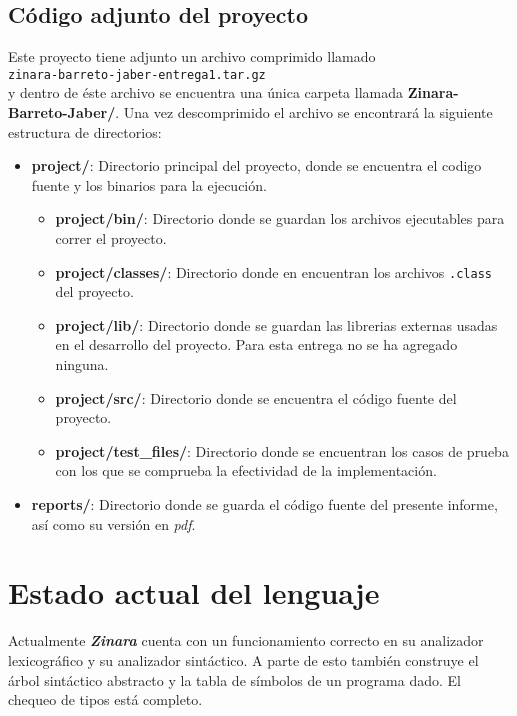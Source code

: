 \documentclass[12pt, spanish]{report}
\begin{document}
\section{C\'odigo adjunto del proyecto}
\label{sec:correr}

Este proyecto tiene adjunto un archivo comprimido llamado\\

\texttt{zinara-barreto-jaber-entrega1.tar.gz}\\

y dentro de \'este archivo se encuentra una \'unica carpeta llamada
\textbf{Zinara-Barreto-Jaber/}. Una vez descomprimido el archivo se
encontrar\'a la siguiente estructura de directorios:

\begin{itemize}
 \item \textbf{project/}: Directorio principal del proyecto, donde se
       encuentra el codigo fuente y los binarios para la ejecuci\'on.
 \begin{itemize}
  \item \textbf{project/bin/}: Directorio donde se guardan los
	archivos ejecutables para correr el proyecto.
  \item \textbf{project/classes/}: Directorio donde en encuentran los
	archivos \texttt{.class} del proyecto.
  \item \textbf{project/lib/}: Directorio donde se guardan las
	librerias externas usadas en el desarrollo del proyecto. Para esta
	entrega no se ha agregado ninguna.
  \item \textbf{project/src/}: Directorio donde se encuentra el c\'odigo
	fuente del proyecto.
  \item \textbf{project/test\_files/}: Directorio donde se encuentran los
	casos de prueba con los que se comprueba la efectividad de la implementaci\'on.
 \end{itemize}
 \item \textbf{reports/}: Directorio donde se guarda el c\'odigo fuente
       del presente informe, as\'i como su versi\'on en \emph{pdf}.
\end{itemize}

\chapter{Estado actual del lenguaje}
\label{chap:estado}

Actualmente \emph{\textbf{Zinara}} cuenta con un funcionamiento
correcto en su analizador lexicogr\'afico y su analizador sint\'actico. A
parte de esto tambi\'en construye el \'arbol sint\'actico abstracto y la
tabla de s\'imbolos de un programa dado. El chequeo de tipos est\'a completo.\\
\end{document}
